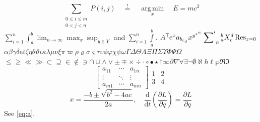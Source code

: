 \[ \sum_{\substack{0\le i\le m\\ 0<j<n}} P(i,j) \quad \overset{!}{=} \quad \underset{x}{\operatorname{arg\,min}} \quad \boxed{E=mc^2} \]
$\sum_{i=1}^n \int_a^b \lim_{n\to\infty} \max_{x} \sup_{y\in Y}$ and $\displaystyle\sum_{i=1}^n \int\limits_a^b$.
$A^{\mathsf T} \mathrm{e}^{x} a_{b_{c_{d}}} x^{y^{z^{w}}} \sideset{}{'}\sum_{n} {}_{a}^{b}X_{c}^{d} \mathop{\mathrm{Res}}_{z=0}$
$\alpha\beta\gamma\delta\epsilon\varepsilon\zeta\eta\theta\vartheta\iota\kappa\lambda\mu\nu\xi\pi\varpi\rho\varrho\sigma\varsigma\tau\upsilon\phi\varphi\chi\psi\omega\Gamma\Delta\Theta\Lambda\Xi\Pi\Sigma\Upsilon\Phi\Psi\Omega$
$\leq\geq\ll\gg\subset\supseteq\in\notin\ni\cap\cup\wedge\vee\pm\mp\times\div\cdot\circ\bullet\star\dagger\infty\partial\nabla\forall\exists\neg\emptyset\aleph\hbar\ell\wp\Re\Im$
\[ \begin{bmatrix} a_{11} & \cdots & a_{1n} \\ \vdots & \ddots & \vdots \\ a_{m1} & \cdots & a_{mn} \end{bmatrix} \begin{array}{c|c} 1 & 2 \\ \hline 3 & 4 \end{array} \]
\[ x = \frac{-b \pm \sqrt{b^2-4ac}}{2a}, \quad \frac{\mathrm{d}}{\mathrm{d}t}\left(\frac{\partial L}{\partial \dot q}\right) = \frac{\partial L}{\partial q} \]
See \eqref{eq:a}.
